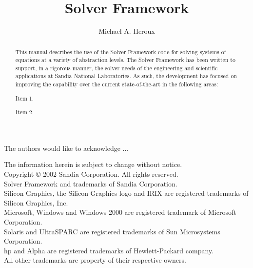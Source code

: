 \documentclass[11pt,twoside,titlepage]{TrilinosDoc}
\title{\TrilinosTitle{} Solver Framework}
\author{Michael A. Heroux}
\begin{document}

\maketitle


\begin{abstract}

This manual describes the use of the \Trilinos{} Solver Framework code
for solving systems of equations at a variety of abstraction levels.  The
\Trilinos{} Solver Framework has been written to support, in a
rigorous manner, the solver needs of the engineering and scientific applications
at Sandia National Laboratories.  As such, the development has focused on improving the
capability over the current state-of-the-art in the following areas:

\begin{TrilinosItemize}

\item Item 1.
\item Item 2.

\end{TrilinosItemize}

\end{abstract}

\clearpage
{}
The authors would like to acknowledge ...

The information herein is subject to change without notice.\\[1em]
Copyright \copyright{} 2002 Sandia Corporation.  All rights reserved.\\[1em]
\TrilinosTM{} Solver Framework and \TrilinosTM{} trademarks of Sandia
Corporation.\\[1em]
Silicon Graphics, the Silicon Graphics logo and IRIX are registered trademarks
of Silicon Graphics, Inc.\\[1em]
Microsoft, Windows and Windows 2000 are registered trademark of Microsoft
Corporation.\\[1em]
Solaris and UltraSPARC are registered trademarks of Sun Microsystems
Corporation. \\[1em]
hp and Alpha are registered trademarks of Hewlett-Packard company. \\[1em]
All other trademarks are property of their respective owners.
\end{document}
